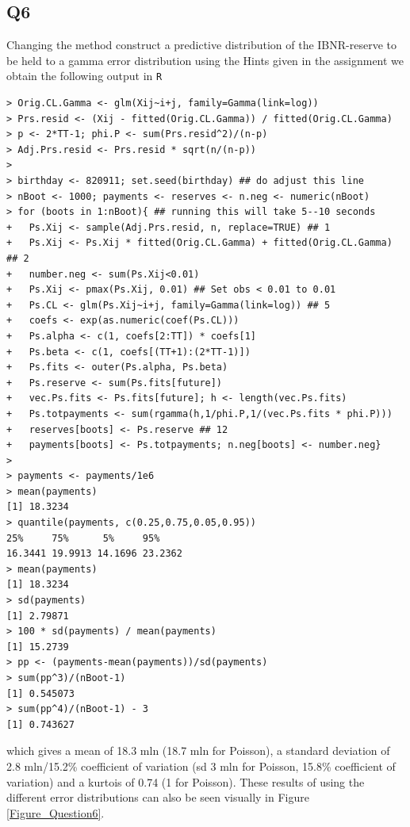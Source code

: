 \documentclass[11pt]{article}
\begin{document}
\subsection*{Q6}
Changing the method construct a predictive distribution of the IBNR-reserve to be held to a gamma error distribution using the Hints given in the assignment we obtain the following output in \verb|R|

\begin{verbatim}
> Orig.CL.Gamma <- glm(Xij~i+j, family=Gamma(link=log))
> Prs.resid <- (Xij - fitted(Orig.CL.Gamma)) / fitted(Orig.CL.Gamma)
> p <- 2*TT-1; phi.P <- sum(Prs.resid^2)/(n-p)
> Adj.Prs.resid <- Prs.resid * sqrt(n/(n-p))
> 
> birthday <- 820911; set.seed(birthday) ## do adjust this line
> nBoot <- 1000; payments <- reserves <- n.neg <- numeric(nBoot)
> for (boots in 1:nBoot){ ## running this will take 5--10 seconds
+   Ps.Xij <- sample(Adj.Prs.resid, n, replace=TRUE) ## 1
+   Ps.Xij <- Ps.Xij * fitted(Orig.CL.Gamma) + fitted(Orig.CL.Gamma) ## 2
+   number.neg <- sum(Ps.Xij<0.01)
+   Ps.Xij <- pmax(Ps.Xij, 0.01) ## Set obs < 0.01 to 0.01
+   Ps.CL <- glm(Ps.Xij~i+j, family=Gamma(link=log)) ## 5
+   coefs <- exp(as.numeric(coef(Ps.CL)))
+   Ps.alpha <- c(1, coefs[2:TT]) * coefs[1]
+   Ps.beta <- c(1, coefs[(TT+1):(2*TT-1)])
+   Ps.fits <- outer(Ps.alpha, Ps.beta)
+   Ps.reserve <- sum(Ps.fits[future])
+   vec.Ps.fits <- Ps.fits[future]; h <- length(vec.Ps.fits)
+   Ps.totpayments <- sum(rgamma(h,1/phi.P,1/(vec.Ps.fits * phi.P)))
+   reserves[boots] <- Ps.reserve ## 12
+   payments[boots] <- Ps.totpayments; n.neg[boots] <- number.neg}
> 
> payments <- payments/1e6
> mean(payments)
[1] 18.3234
> quantile(payments, c(0.25,0.75,0.05,0.95))
25%     75%      5%     95% 
16.3441 19.9913 14.1696 23.2362 
> mean(payments)
[1] 18.3234
> sd(payments) 
[1] 2.79871
> 100 * sd(payments) / mean(payments) 
[1] 15.2739
> pp <- (payments-mean(payments))/sd(payments)
> sum(pp^3)/(nBoot-1)
[1] 0.545073
> sum(pp^4)/(nBoot-1) - 3
[1] 0.743627
\end{verbatim}

which gives a mean of 18.3 mln (18.7 mln for Poisson), a standard deviation of 2.8 mln/15.2\% coefficient of variation (sd 3 mln for Poisson, 15.8\% coefficient of variation) and a kurtois of 0.74 (1 for Poisson). These results of using the different error distributions can also be seen visually in Figure \ref{Figure_Question6}.
\end{document}

